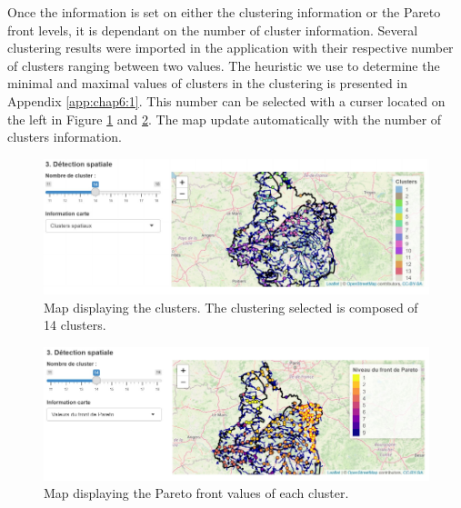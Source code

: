 Once the information is set on either the clustering information or the Pareto front levels, it is dependant on the number of cluster information. Several clustering results were imported in the application with their respective number of clusters ranging between two values. The heuristic we use to determine the minimal and maximal values of clusters in the clustering is presented in Appendix \ref{app:chap6:1}. This number can be selected with a curser located on the left in Figure \ref{fig:Imapp6} and \ref{fig:Imapp7}. The map update automatically with the number of clusters information.  

\begin{figure}[ht]
  \centering
  \includegraphics[]{figs/Chap6/Im_app6.pdf}
  \caption{Map displaying the clusters. The clustering selected is composed of 14 clusters.}
  \label{fig:Imapp6}
\end{figure}

\begin{figure}[ht]
  \centering
  \includegraphics[]{figs/Chap6/Im_app7.pdf}
  \caption{Map displaying the Pareto front values of each cluster.}
  \label{fig:Imapp7}
\end{figure}

